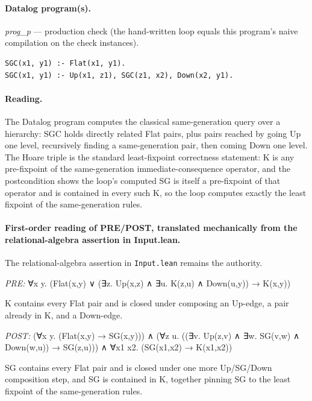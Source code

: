 \documentclass[10pt]{article}
\begin{document}
\paragraph{Datalog program(s).}

{\raggedright\textit{prog\_p} --- production check (the hand-written loop equals this program's naive compilation on the check instances).\par}

\begin{Verbatim}[fontsize=\scriptsize,breaklines=true,breakanywhere=true,frame=single,framesep=1.5mm]
SGC(x1, y1) :- Flat(x1, y1).
SGC(x1, y1) :- Up(x1, z1), SGC(z1, x2), Down(x2, y1).
\end{Verbatim}

\paragraph{Reading.} The Datalog program computes the classical same-generation query over a hierarchy: SGC holds directly related Flat pairs, plus pairs reached by going Up one level, recursively finding a same-generation pair, then coming Down one level. The Hoare triple is the standard least-fixpoint correctness statement: K is any pre-fixpoint of the same-generation immediate-consequence operator, and the postcondition shows the loop's computed SG is itself a pre-fixpoint of that operator and is contained in every such K, so the loop computes exactly the least fixpoint of the same-generation rules.

\paragraph{First-order reading of PRE/POST, translated mechanically from the relational-algebra assertion in Input.lean.} The relational-algebra assertion in \texttt{Input.lean} remains the authority.

\textit{PRE:} ∀x y. (Flat(x,y) ∨ (∃z. Up(x,z) ∧ ∃u. K(z,u) ∧ Down(u,y)) → K(x,y))\par K contains every Flat pair and is closed under composing an Up-edge, a pair already in K, and a Down-edge.

\textit{POST:} (∀x y. (Flat(x,y) → SG(x,y))) ∧ (∀z u. ((∃v. Up(z,v) ∧ ∃w. SG(v,w) ∧ Down(w,u)) → SG(z,u))) ∧ ∀x1 x2. (SG(x1,x2) → K(x1,x2))\par SG contains every Flat pair and is closed under one more Up/SG/Down composition step, and SG is contained in K, together pinning SG to the least fixpoint of the same-generation rules.
\end{document}
